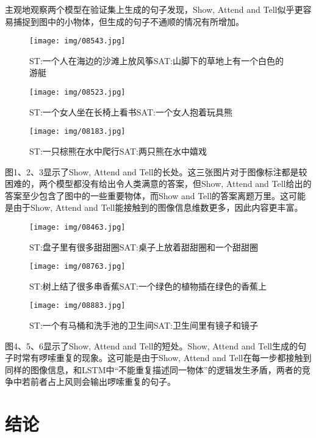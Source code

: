 \documentclass[10pt,a4paper,UTF8]{ctexart}
\begin{document}
\begin{spacing}{1.5}
		主观地观察两个模型在验证集上生成的句子发现，Show, Attend and Tell似乎更容易捕捉到图中的小物体，但生成的句子不通顺的情况有所增加。
		
		\begin{figure}[htbp]
			\centering
			\texttt{[image: img/08543.jpg]}
			\caption{ST:一个人在海边的沙滩上放风筝\space SAT:山脚下的草地上有一个白色的游艇}
		\end{figure}
		\begin{figure}[htbp]
			\centering
			\texttt{[image: img/08523.jpg]}
			\caption{ST:一个女人坐在长椅上看书\space SAT:一个女人抱着玩具熊}
		\end{figure}
		\begin{figure}[htbp]
			\centering
			\texttt{[image: img/08183.jpg]}
			\caption{ST:一只棕熊在水中爬行\space SAT:两只熊在水中嬉戏}
		\end{figure}
		图1、2、3显示了Show, Attend and Tell的长处。这三张图片对于图像标注都是较困难的，两个模型都没有给出令人类满意的答案，但Show, Attend and Tell给出的答案至少包含了图中的一些重要物体，而Show and Tell的答案离题万里。这可能是由于Show, Attend and Tell能接触到的图像信息维数更多，因此内容更丰富。
		
		\begin{figure}[htbp]
			\centering
			\texttt{[image: img/08463.jpg]}
			\caption{ST:盘子里有很多甜甜圈\space SAT:桌子上放着甜甜圈和一个甜甜圈}
		\end{figure}
		\begin{figure}[htbp]
			\centering
			\texttt{[image: img/08763.jpg]}
			\caption{ST:树上结了很多串香蕉\space SAT:一个绿色的植物插在绿色的香蕉上}
		\end{figure}
		\begin{figure}[htbp]
			\centering
			\texttt{[image: img/08883.jpg]}
			\caption{ST:一个有马桶和洗手池的卫生间\space SAT:卫生间里有镜子和镜子}
		\end{figure}
		
		图4、5、6显示了Show, Attend and Tell的短处。Show, Attend and Tell生成的句子时常有啰嗦重复的现象。这可能是由于Show, Attend and Tell在每一步都接触到同样的图像信息，和LSTM中“不能重复描述同一物体”的逻辑发生矛盾，两者的竞争中若前者占上风则会输出啰嗦重复的句子。
		
		\section{结论}
		

\end{spacing}
\end{document}
